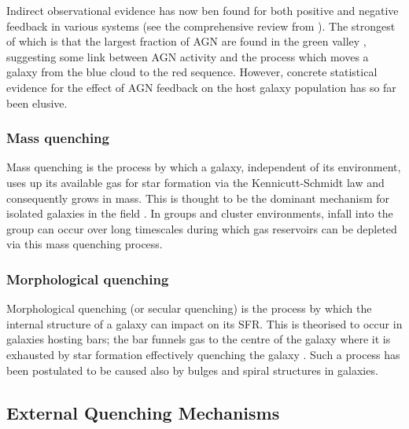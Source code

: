 Indirect observational evidence has now ben found for both positive and negative feedback in various systems (see the comprehensive review from \citealt{fabian12}). The strongest of which is that the largest fraction of AGN are found in the green valley \citep{cowie08, Hickox09, schawinski10a}, suggesting some link between AGN activity and the process which moves a galaxy from the blue cloud to the red sequence. However, concrete statistical evidence for the effect of AGN feedback on the host galaxy population has so far been elusive.


\subsubsection{Mass quenching}\label{sec:massquench}
Mass quenching is the process by which a galaxy, independent of its environment, uses up its available gas for star formation via the Kennicutt-Schmidt law \citep{schmidt59, kennicutt98} and consequently grows in mass. This is thought to be the dominant mechanism for isolated galaxies in the field \citep{kormendy04}. In groups and cluster environments, infall into the group can occur over long timescales during which gas reservoirs can be depleted via this mass quenching process.
 
\subsubsection{Morphological quenching}\label{sec:moprhquench}
Morphological quenching (or secular quenching) is the process by which the internal structure of a galaxy can impact on its SFR. This is theorised to occur in galaxies hosting bars; the bar funnels gas to the centre of the galaxy \citep{athanassoula92a} where it is exhausted by star formation effectively quenching the galaxy \citep{sheth05, zurita04, masters10c}. Such a process has been postulated to be caused also by bulges \citep{bluck14} and spiral \citep{hart16} structures in galaxies. 
  
\subsection{External Quenching Mechanisms}\label{sec:extquench}
  
